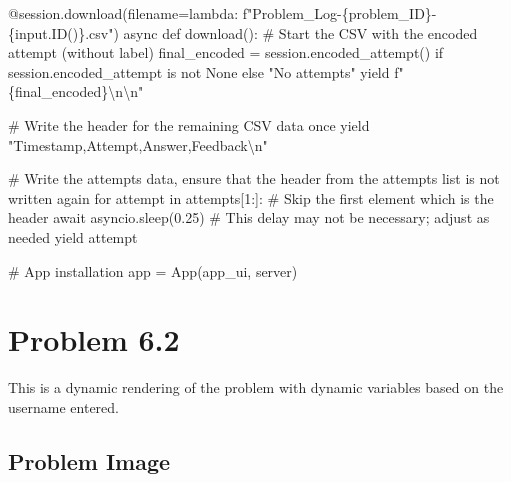 \documentclass[
  letterpaper,
  DIV=11,
  numbers=noendperiod]{scrreprt}
\newenvironment{Shaded}{\begin{snugshade}}{\end{snugshade}}
\newcommand{\NormalTok}[1]{\textcolor[rgb]{0.00,0.23,0.31}{#1}}
\begin{document}
\begin{Shaded}
\begin{Highlighting}[]
\NormalTok{    @session.download(filename=lambda: f"Problem\_Log{-}\{problem\_ID\}{-}\{input.ID()\}.csv")}
\NormalTok{    async def download():}
\NormalTok{        \# Start the CSV with the encoded attempt (without label)}
\NormalTok{        final\_encoded = session.encoded\_attempt() if session.encoded\_attempt is not None else "No attempts"}
\NormalTok{        yield f"\{final\_encoded\}\textbackslash{}n\textbackslash{}n"}
        
\NormalTok{        \# Write the header for the remaining CSV data once}
\NormalTok{        yield "Timestamp,Attempt,Answer,Feedback\textbackslash{}n"}
        
\NormalTok{        \# Write the attempts data, ensure that the header from the attempts list is not written again}
\NormalTok{        for attempt in attempts[1:]:  \# Skip the first element which is the header}
\NormalTok{            await asyncio.sleep(0.25)  \# This delay may not be necessary; adjust as needed}
\NormalTok{            yield attempt}


\NormalTok{\# App installation}
\NormalTok{app = App(app\_ui, server)}
\end{Highlighting}
\end{Shaded}

\chapter*{Problem 6.2}\label{problem-6.2}


This is a dynamic rendering of the problem with dynamic variables based
on the username entered.

\section*{Problem Image}\label{problem-image-41}

\end{document}
